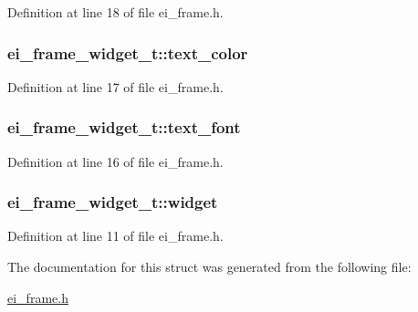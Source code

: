 Definition at line 18 of file ei\_\-frame.h.\hypertarget{structei__frame__widget__t_aecc7c627bf739528388dd0b97fd4ec6c}{
\subsubsection[{text\_\-color}]{ {\bf ei\_\-frame\_\-widget\_\-t::text\_\-color}}}
\label{structei__frame__widget__t_aecc7c627bf739528388dd0b97fd4ec6c}


Definition at line 17 of file ei\_\-frame.h.\hypertarget{structei__frame__widget__t_a3832154ce5fe1aec4eb4bc372a05158a}{
\subsubsection[{text\_\-font}]{ {\bf ei\_\-frame\_\-widget\_\-t::text\_\-font}}}
\label{structei__frame__widget__t_a3832154ce5fe1aec4eb4bc372a05158a}


Definition at line 16 of file ei\_\-frame.h.\hypertarget{structei__frame__widget__t_a89903d2fb772642f95987d3faf1494e0}{
\subsubsection[{widget}]{ {\bf ei\_\-frame\_\-widget\_\-t::widget}}}
\label{structei__frame__widget__t_a89903d2fb772642f95987d3faf1494e0}


Definition at line 11 of file ei\_\-frame.h.

The documentation for this struct was generated from the following file:\begin{DoxyCompactItemize}
\item 
\hyperlink{ei__frame_8h}{ei\_\-frame.h}\end{DoxyCompactItemize}
